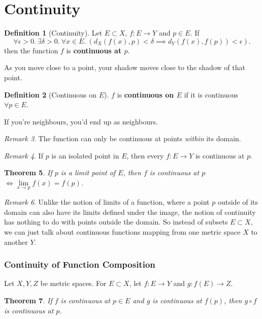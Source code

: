 \documentclass[a4paper,12pt]{report}
\newcommand{\tb}{\textbf}
\theoremstyle{plain}
\newtheorem{theorem}{\color{blue}Theorem}[chapter] %
\theoremstyle{definition}
\newtheorem{definition}[theorem]{\color{red}Definition} %
\theoremstyle{remark}
\newtheorem{remark}[theorem]{\color{ForestGreen}Remark} %
\begin{document}
\section{Continuity}
\begin{definition}[Continuity]
Let $E\subset X$, $f:E\to Y$ and $p\in E$. If
\[ 
\forall\epsilon>0.\:\exists\delta>0.\:\forall x\in E.\:\left(d_X(f(x),p)<\delta\implies d_Y(f(x),f(p))<\epsilon\right).
\]
then the function $f$ is \tb{continuous at $p$}.
\end{definition}
\begin{insight}
As you move close to a point, your shadow moves close to the shadow of that point.
\end{insight}
\begin{definition}[Continuous on $E$]
$f$ is \tb{continuous on $E$} if it is continuous $\forall p\in E$.
\end{definition}
\begin{insight}
If you're neighbours, you'd end up as neighbours.
\end{insight}
\begin{remark}
The function can only be continuous at points \emph{within} its domain.
\end{remark}
\begin{remark}
If $p$ is an isolated point in $E$, then every $f:E\to Y$ is continuous at $p$.
\end{remark}
\begin{theorem}
If $p$ is a limit point of $E$, then $f$ is continuous at $p$ $\iff\lim\limits_{x\to p} f(x)=f(p)$.
\end{theorem}
\begin{remark}
Unlike the notion of limits of a function, where a point $p$ outside of its domain can also have its limits defined under the image, the notion of continuity has nothing to do with points outside the domain. So instead of subsets $E\subset X$, we can just talk about continuous functions mapping from one metric space $X$ to another $Y$.
\end{remark}
\subsubsection{Continuity of Function Composition}
Let $X,Y,Z$ be metric spaces. For $E\subset X$, let $f:E\to Y$ and $g:f(E)\to Z$.
\begin{theorem}
If $f$ is continuous at $p\in E$ and $g$ is continuous at $f(p)$, then $g\circ f$ is continuous at $p$.
\end{theorem}
\end{document}
